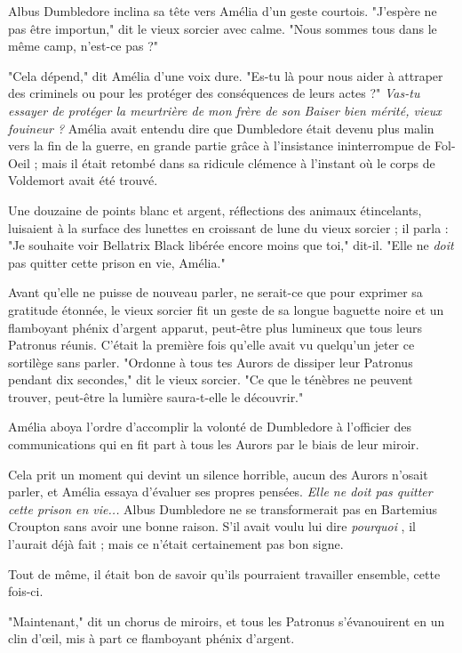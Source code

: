 Albus Dumbledore inclina sa tête vers Amélia d'un geste courtois. "J'espère ne pas être importun," dit le vieux sorcier avec calme. "Nous sommes tous dans le même camp, n'est-ce pas ?"

"Cela dépend," dit Amélia d'une voix dure. "Es-tu là pour nous aider à attraper des criminels ou pour les protéger des conséquences de leurs actes ?" \emph{Vas-tu essayer de protéger la meurtrière de mon frère de son Baiser bien mérité, vieux fouineur ? } Amélia avait entendu dire que Dumbledore était devenu plus malin vers la fin de la guerre, en grande partie grâce à l'insistance ininterrompue de Fol-Oeil ; mais il était retombé dans sa ridicule clémence à l'instant où le corps de Voldemort avait été trouvé.

Une douzaine de points blanc et argent, réflections des animaux étincelants, luisaient à la surface des lunettes en croissant de lune du vieux sorcier ; il parla : "Je souhaite voir Bellatrix Black libérée encore moins que toi," dit-il. "Elle ne \emph{doit}  pas quitter cette prison en vie, Amélia."

Avant qu'elle ne puisse de nouveau parler, ne serait-ce que pour exprimer sa gratitude étonnée, le vieux sorcier fit un geste de sa longue baguette noire et un flamboyant phénix d'argent apparut, peut-être plus lumineux que tous leurs Patronus réunis. C'était la première fois qu'elle avait vu quelqu'un jeter ce sortilège sans parler. "Ordonne à tous tes Aurors de dissiper leur Patronus pendant dix secondes," dit le vieux sorcier. "Ce que le ténèbres ne peuvent trouver, peut-être la lumière saura-t-elle le découvrir."

Amélia aboya l'ordre d'accomplir la volonté de Dumbledore à l'officier des communications qui en fit part à tous les Aurors par le biais de leur miroir.

Cela prit un moment qui devint un silence horrible, aucun des Aurors n'osait parler, et Amélia essaya d'évaluer ses propres pensées. \emph{Elle ne doit pas quitter cette prison en vie...}  Albus Dumbledore ne se transformerait pas en Bartemius Croupton sans avoir une bonne raison. S'il avait voulu lui dire \emph{pourquoi} , il l'aurait déjà fait ; mais ce n'était certainement pas bon signe.

Tout de même, il était bon de savoir qu'ils pourraient travailler ensemble, cette fois-ci.

"Maintenant," dit un chorus de miroirs, et tous les Patronus s'évanouirent en un clin d'œil, mis à part ce flamboyant phénix d'argent.

